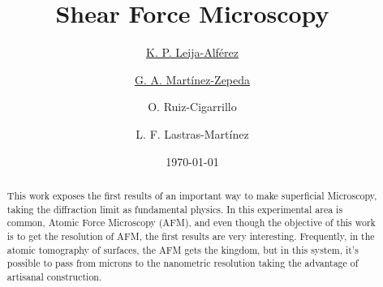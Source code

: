 \documentclass[reprint,aps,prb,citeautoscript,altaffilletter]{revtex4-2}
\begin{document}
	
	
	\title{ Shear Force Microscopy }
	\author{\underline{K. P. Leija-Alf\'erez}}
	\author{\underline{G. A. Mart\'inez-Zepeda}}
	\author{O. Ruiz-Cigarrillo}
	\author{L. F. Lastras-Mart\'inez}
	
	\date{\today}
	
	\begin{abstract}
		This work exposes the first results of an important way to make superficial Microscopy, taking the diffraction limit as fundamental physics. In this experimental area is common, Atomic Force Microscopy  (AFM), and even though the objective of this work is to get the resolution of AFM, the first results are very interesting. Frequently,  in the atomic tomography of surfaces, the AFM gets the kingdom, but in this system, it's possible to pass from microns to the nanometric resolution taking the advantage of artisanal construction. 
	\end{abstract}
	
	\maketitle
	

	
%	
%	
	
\end{document}
